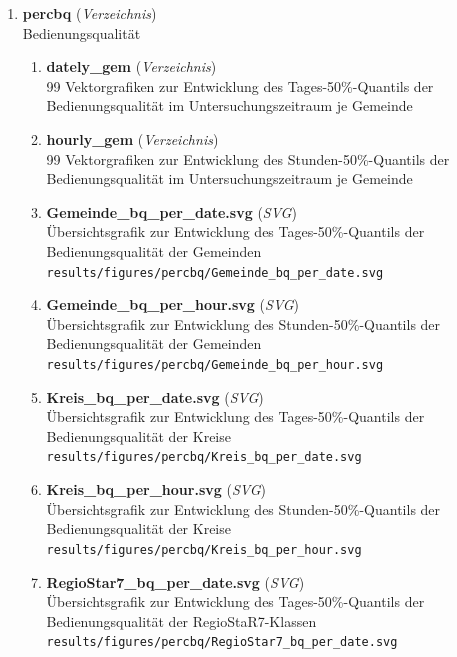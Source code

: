 \begin{enumerate}[label=\arabic*., leftmargin=*, itemsep=0.5em, topsep=0.3em]
\begin{enumerate}[label=\arabic{enumi}.\arabic*, leftmargin=*, itemsep=0.5em, topsep=0.3em]
\begin{enumerate}[label=\arabic{enumi}.\arabic{enumii}.\arabic*, leftmargin=*, itemsep=0.5em, topsep=0.3em]
\item \textbf{percbq} \textnormal{(\textit{Verzeichnis})}\\
Bedienungsqualität
\begin{enumerate}[label=\arabic{enumi}.\arabic{enumii}.\arabic{enumiii}.\arabic*, leftmargin=*, itemsep=0.5em, topsep=0.3em]
\item \textbf{dately\_gem} \textnormal{(\textit{Verzeichnis})}\\
99 Vektorgrafiken zur Entwicklung des Tages-50\%-Quantils der Bedienungsqualität im Untersuchungszeitraum je Gemeinde
\item \textbf{hourly\_gem} \textnormal{(\textit{Verzeichnis})}\\
99 Vektorgrafiken zur Entwicklung des Stunden-50\%-Quantils der Bedienungsqualität im Untersuchungszeitraum je Gemeinde
\item \textbf{Gemeinde\_bq\_per\_date.svg} \textnormal{(\textit{SVG})}\\
Übersichtsgrafik zur Entwicklung des Tages-50\%-Quantils der Bedienungsqualität der Gemeinden\\
\texttt{\small results/figures/percbq/Gemeinde\_bq\_per\_date.svg}
\item \textbf{Gemeinde\_bq\_per\_hour.svg} \textnormal{(\textit{SVG})}\\
Übersichtsgrafik zur Entwicklung des Stunden-50\%-Quantils der Bedienungsqualität der Gemeinden\\
\texttt{\small results/figures/percbq/Gemeinde\_bq\_per\_hour.svg}
\item \textbf{Kreis\_bq\_per\_date.svg} \textnormal{(\textit{SVG})}\\
Übersichtsgrafik zur Entwicklung des Tages-50\%-Quantils der Bedienungsqualität der Kreise\\
\texttt{\small results/figures/percbq/Kreis\_bq\_per\_date.svg}
\item \textbf{Kreis\_bq\_per\_hour.svg} \textnormal{(\textit{SVG})}\\
Übersichtsgrafik zur Entwicklung des Stunden-50\%-Quantils der Bedienungsqualität der Kreise\\
\texttt{\small results/figures/percbq/Kreis\_bq\_per\_hour.svg}
\item \textbf{RegioStar7\_bq\_per\_date.svg} \textnormal{(\textit{SVG})}\\
Übersichtsgrafik zur Entwicklung des Tages-50\%-Quantils der Bedienungsqualität der RegioStaR7-Klassen\\
\texttt{\small results/figures/percbq/RegioStar7\_bq\_per\_date.svg}

\end{enumerate}
\end{enumerate}
\end{enumerate}
\end{enumerate}

